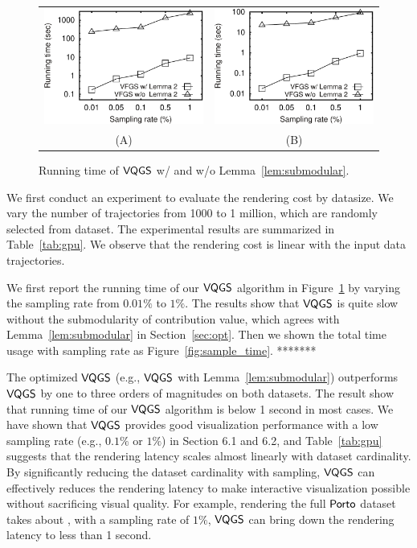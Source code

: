 \begin{figure}
	\centering
	\small
	\begin{tabular}{cc}
		\includegraphics[width=0.44\columnwidth]{pictures/tporto}
		&
		\includegraphics[width=0.44\columnwidth]{pictures/tshenzhen}
		\\
		(A) \pt{}
		&
		(B) \sz{}	
	\end{tabular}
	\vspace{-3mm}
	\caption{Running time of $\mathsf{VQGS}$ w/ and w/o Lemma~\ref{lem:submodular}.}
	\label{fig:cost}
	\vspace{-6mm}
\end{figure}
We first conduct an experiment to evaluate the rendering cost by datasize. We vary the number of trajectories from 1000 to 1 million, which are randomly selected from \pt{} dataset. The experimental results are summarized in Table~\ref{tab:gpu}. We observe that the rendering cost is linear with the input data trajectories.

We first report the running time of our $\mathsf{VQGS}$ algorithm in Figure~\ref{fig:cost} by varying the sampling rate from $0.01\%$ to $1\%$. The results show that $\mathsf{VQGS}$ is quite slow without the submodularity of contribution value, which agrees with Lemma~\ref{lem:submodular} in Section~\ref{sec:opt}.
Then we shown the total time usage with sampling rate as Figure~\ref{fig:sample_time}. {*******}

The optimized $\mathsf{VQGS}$ (e.g., $\mathsf{VQGS}$ with Lemma~\ref{lem:submodular}) outperforms $\mathsf{VQGS}$ by one to three orders of magnitudes on both datasets. The result show that running time of our $\mathsf{VQGS}$ algorithm is below 1 second in most cases. We have shown that $\mathsf{VQGS}$ provides good visualization performance with a low sampling rate (e.g., $0.1\%$ or $1\%$) in Section 6.1 and 6.2,  and Table~\ref{tab:gpu} suggests that the rendering latency scales almost linearly with dataset cardinality. By significantly reducing the dataset cardinality with sampling, $\mathsf{VQGS}$ can effectively reduces the rendering latency to make interactive visualization possible without sacrificing visual quality. For example, rendering the full $\textsf{Porto}{}$ dataset takes about , with a sampling rate of $1\%$, $\mathsf{VQGS}$ can bring down the rendering latency to less than 1 second.

